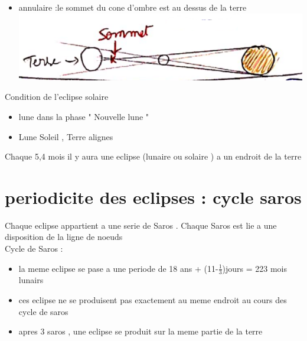 \documentclass[12pt]{book}
\begin{document}
\begin{itemize}
\begin{itemize}
                    \item annulaire :le sommet du cone d'ombre est au dessus de la terre \\
                        \includegraphics[width=0.3\linewidth]{pic/solareclipsannulair.png}
                \end{itemize}
                Condition de l'eclipse solaire \begin{itemize}
                    \item lune dans la phase " Nouvelle lune "
                    \item Lune Soleil , Terre alignes
                \end{itemize}
        \end{itemize}
        Chaque 5,4 mois il y aura une eclipse (lunaire ou solaire ) a un endroit de la terre 
        \section{periodicite des eclipses : cycle saros}
            Chaque eclipse appartient a une serie de Saros . Chaque Saros est lie a une disposition de la ligne de noeuds \\
            Cycle de Saros : \\
                \begin{itemize}
                    \item la meme eclipse se pase a une periode de 18 ans + (11-$ \frac{1}{3} $)jours = 223 mois lunairs 
                    \item ces eclipse ne se produisent pas exactement au meme endroit au cours des cycle de saros 
                    \item apres 3 saros , une eclipse se produit sur la meme partie de la terre
                \end{itemize}
\end{document}
